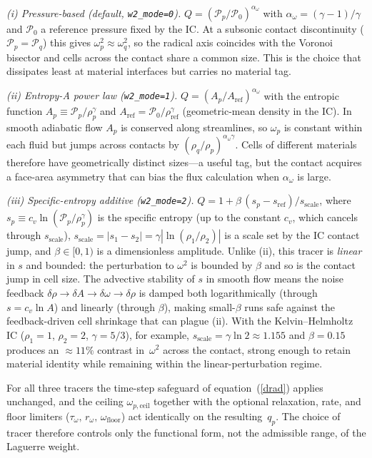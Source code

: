 \documentclass[twocolumn]{aastex63}
\newcommand{\pressure}[0]{\mathcal{P}}
\begin{document}
\textit{(i) Pressure-based (default, \texttt{w2\_mode=0}).}
$Q = \left(\pressure_p/\pressure_0\right)^{\alpha_\omega}$ with
$\alpha_\omega=(\gamma-1)/\gamma$ and $\pressure_0$ a reference pressure
fixed by the IC.  At a subsonic contact discontinuity
($\pressure_p=\pressure_q$) this gives $\omega_p^2\approx\omega_q^2$, so
the radical axis coincides with the Voronoi bisector and cells across the
contact share a common size.  This is the choice that dissipates least at
material interfaces but carries no material tag.

\textit{(ii) Entropy-A power law (\texttt{w2\_mode=1}).}
$Q = \left(A_p/A_\textrm{ref}\right)^{\alpha_\omega}$ with the entropic
function $A_p\equiv \pressure_p/\rho_p^{\gamma}$ and
$A_\textrm{ref}=\pressure_0/\rho_\textrm{ref}^{\gamma}$ (geometric-mean
density in the IC).  In smooth adiabatic flow $A_p$ is conserved along
streamlines, so $\omega_p$ is constant within each fluid but jumps across
contacts by $(\rho_q/\rho_p)^{\alpha_\omega\gamma}$.  Cells of different
materials therefore have geometrically distinct sizes---a useful tag,
but the contact acquires a face-area asymmetry that can bias the flux
calculation when $\alpha_\omega$ is large.

\textit{(iii) Specific-entropy additive (\texttt{w2\_mode=2}).}
$Q = 1 + \beta\,(s_p - s_\textrm{ref})/s_\textrm{scale}$, where
$s_p\equiv c_v\ln(\pressure_p/\rho_p^{\gamma})$ is the specific entropy
(up to the constant $c_v$, which cancels through
$s_\textrm{scale}$),
$s_\textrm{scale}=|s_1-s_2|=\gamma|\ln(\rho_1/\rho_2)|$ is a scale set by
the IC contact jump, and $\beta\in[0,1)$ is a dimensionless amplitude.
Unlike (ii), this tracer is \emph{linear} in $s$ and bounded: the
perturbation to $\omega^2$ is bounded by $\beta$ and so is the contact
jump in cell size.  The advective stability of $s$ in smooth flow means
the noise feedback $\delta\rho\to\delta A\to\delta\omega\to\delta\rho$
is damped both logarithmically (through $s = c_v\ln A$) and linearly
(through $\beta$), making small-$\beta$ runs safe against the
feedback-driven cell shrinkage that can plague (ii).
With the Kelvin--Helmholtz IC ($\rho_1=1$, $\rho_2=2$, $\gamma=5/3$), for example,
$s_\textrm{scale}=\gamma\ln 2\approx 1.155$ and $\beta=0.15$ produces an
$\approx\!11\%$ contrast in~$\omega^2$ across the contact, strong enough
to retain material identity while remaining within the
linear-perturbation regime.

For all three tracers the time-step safeguard of equation~(\ref{drad})
applies unchanged, and the ceiling $\omega_{p,\textrm{ceil}}$ together
with the optional relaxation, rate, and floor limiters
($\tau_\omega,\,r_\omega,\,\omega_\textrm{floor}$) act identically on the
resulting~$q_p$.  The choice of tracer therefore controls only the
functional form, not the admissible range, of the Laguerre weight.
\end{document}
